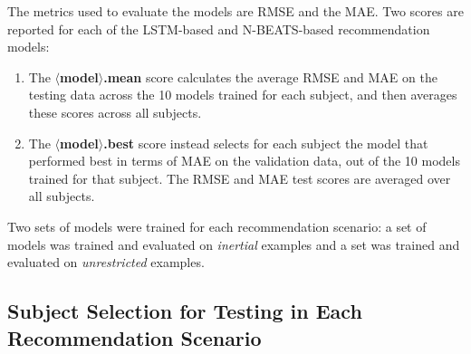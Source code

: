 The metrics used to evaluate the models are \ac{RMSE} and the \ac{MAE}. Two scores are reported for each of the \ac{LSTM}-based and \ac{N-BEATS}-based recommendation models:
\begin{enumerate}
    \item The {\bf $\langle$model$\rangle$.mean} score calculates the average \ac{RMSE} and \ac{MAE} on the testing data across the 10 models trained for each subject, and then averages these scores across all subjects.
    \item The {\bf $\langle$model$\rangle$.best} score instead selects for each subject the model that performed best in terms of \ac{MAE} on the validation data, out of the 10 models trained for that subject. The \ac{RMSE} and \ac{MAE} test scores are averaged over all subjects.
\end{enumerate}
Two sets of models were trained for each recommendation scenario: a set of models was trained and evaluated on {\it inertial} examples and a set was trained and evaluated on {\it unrestricted} examples. 



\subsection{Subject Selection for Testing in Each Recommendation Scenario}

